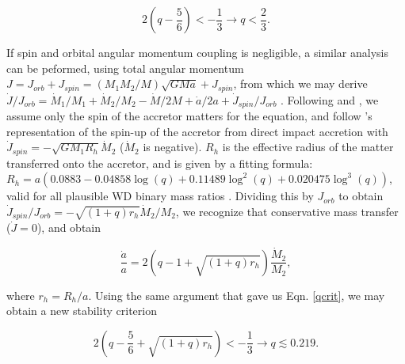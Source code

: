 \begin{equation}
2(q - \frac{5}{6}) < - \frac{1}{3} \rightarrow q < \frac{2}{3}.
\label{qcrit}
\end{equation}

If spin and orbital angular momentum coupling is negligible, a similar analysis can be peformed, using total angular momentum $J = J_{orb} + J_{spin} = (M_1M_2/M)\sqrt{GMa} + J_{spin}$, from which we may derive $\dot{J}/J_{orb} = \dot{M}_1/M_1 + \dot{M}_2/M_2 - \dot{M}/2M + \dot{a}/2a + \dot{J}_{spin}/J_{orb}$ \citep{marsns04}.  Following \citeauthor{marsns04} and \citeauthor{nele+01}, we assume only the spin of the accretor matters for the equation, and follow \cite{verbr88}'s representation of the spin-up of the accretor from direct impact accretion with $\dot{J}_{spin} = -\sqrt{GM_1R_h}\dot{M}_2$ ($\dot{M}_2$ is negative).  $R_h$ is the effective radius of the matter transferred onto the accretor, and is given by a fitting formula: $R_h = a(0.0883 - 0.04858\log({q}) + 0.11489{\log}^2(q) + 0.020475{\log}^3(q))$, valid for all plausible WD binary mass ratios \citep{verbr88}.  Dividing this by $J_{orb}$ to obtain $\dot{J}_{spin}/J_{orb} = -\sqrt{(1 + q)r_h}\dot{M}_2/M_2$, we recognize that conservative mass transfer ($\dot{J} = 0$), and obtain \citep{marsns04,nele+01}

\begin{equation}
\frac{\dot{a}}{a} = 2(q - 1 + \sqrt{(1 + q)r_h})\frac{\dot{M}_2}{M_2},
\label{adotovera2}
\end{equation}

\noindent where $r_h = R_h/a$.  Using the same argument that gave us Eqn. \ref{qcrit}, we may obtain a new stability criterion \citep{nele+01,verbr88}

\begin{equation}
2(q - \frac{5}{6} + \sqrt{(1 + q)r_h}) < - \frac{1}{3} \rightarrow q \lesssim 0.219.
\label{qcrit2}
\end{equation}

